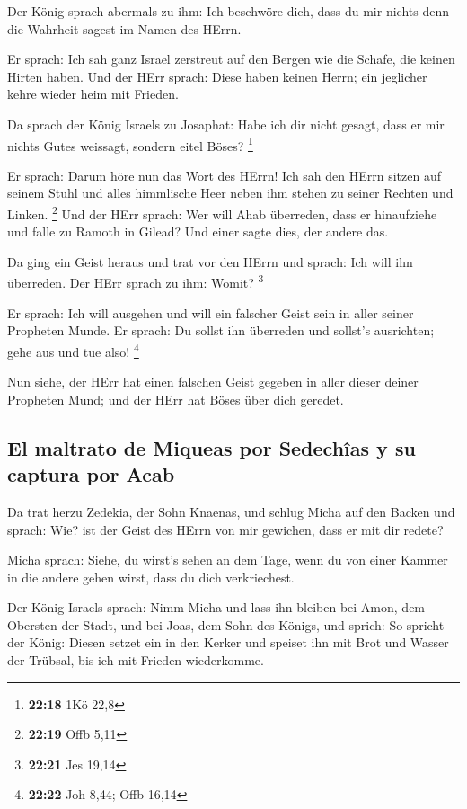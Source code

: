  Der König sprach abermals zu ihm: Ich beschwöre dich,
dass du mir nichts denn die Wahrheit sagest im Namen des HErrn.

 Er sprach: Ich sah ganz Israel zerstreut auf den Bergen
wie die Schafe, die keinen Hirten haben. Und der HErr sprach: Diese
haben keinen Herrn; ein jeglicher kehre wieder heim mit Frieden.

 Da sprach der König Israels zu Josaphat: Habe ich dir
nicht gesagt, dass er mir nichts Gutes weissagt, sondern eitel Böses?
\footnote{\textbf{22:18} 1Kö 22,8}

 Er sprach: Darum höre nun das Wort des HErrn! Ich sah
den HErrn sitzen auf seinem Stuhl und alles himmlische Heer neben ihm
stehen zu seiner Rechten und Linken. \footnote{\textbf{22:19} Offb 5,11}
 Und der HErr sprach: Wer will Ahab überreden, dass er
hinaufziehe und falle zu Ramoth in Gilead? Und einer sagte dies, der
andere das.

 Da ging ein Geist heraus und trat vor den HErrn und
sprach: Ich will ihn überreden. Der HErr sprach zu ihm: Womit?
\footnote{\textbf{22:21} Jes 19,14}

 Er sprach: Ich will ausgehen und will ein falscher Geist
sein in aller seiner Propheten Munde. Er sprach: Du sollst ihn überreden
und sollst's ausrichten; gehe aus und tue also! \footnote{\textbf{22:22}
  Joh 8,44; Offb 16,14}

 Nun siehe, der HErr hat einen falschen Geist gegeben in
aller dieser deiner Propheten Mund; und der HErr hat Böses über dich
geredet.

\hypertarget{el-maltrato-de-miqueas-por-sedechuxeeas-y-su-captura-por-acab}{%
\subsection{El maltrato de Miqueas por Sedechîas y su captura por
Acab}\label{el-maltrato-de-miqueas-por-sedechuxeeas-y-su-captura-por-acab}}

 Da trat herzu Zedekia, der Sohn Knaenas, und schlug
Micha auf den Backen und sprach: Wie? ist der Geist des HErrn von mir
gewichen, dass er mit dir redete?

 Micha sprach: Siehe, du wirst's sehen an dem Tage, wenn
du von einer Kammer in die andere gehen wirst, dass du dich
verkriechest.

 Der König Israels sprach: Nimm Micha und lass ihn
bleiben bei Amon, dem Obersten der Stadt, und bei Joas, dem Sohn des
Königs,  und sprich: So spricht der König: Diesen setzet
ein in den Kerker und speiset ihn mit Brot und Wasser der Trübsal, bis
ich mit Frieden wiederkomme.

